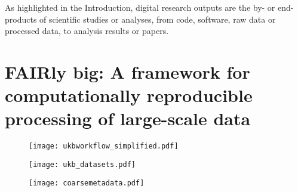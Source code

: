 As highlighted in the Introduction, digital research outputs are the by- or end-products of scientific studies or analyses, from code, software, raw data or processed data, to analysis results or papers.

\pagebreak

\section{FAIRly big: A framework for computationally reproducible processing of large-scale data}




\begin{figure}
	\centering
	\texttt{[image: ukbworkflow\_simplified.pdf]}
	\caption[]{}
	\label{fig:ngram}
\end{figure}

\begin{figure}
	\centering
	\texttt{[image: ukb\_datasets.pdf]}
	\caption[]{}
	\label{fig:ngram}
\end{figure}

\begin{figure}
	\centering
	\texttt{[image: coarsemetadata.pdf]}
	\caption[]{}
	\label{fig:ngram}
\end{figure}



\pagebreak